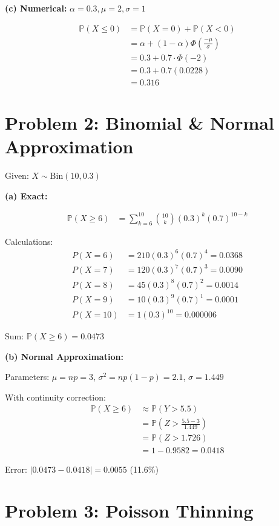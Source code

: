 \documentclass[10pt,twocolumn]{article}
\begin{document}
\textbf{(c) Numerical:} \(\alpha=0.3, \mu=2, \sigma=1\)

\begin{align*}
\mathbb{P}(X \leq 0) &= \mathbb{P}(X = 0) + \mathbb{P}(X < 0) \\
&= \alpha + (1-\alpha)\Phi\left(\frac{-\mu}{\sigma}\right) \\
&= 0.3 + 0.7 \cdot \Phi(-2) \\
&= 0.3 + 0.7(0.0228) \\
&= \boxed{0.316}
\end{align*}

\section*{Problem 2: Binomial \& Normal Approximation}

Given: \(X \sim \text{Bin}(10, 0.3)\)

\textbf{(a) Exact:}

\begin{align*}
\mathbb{P}(X \geq 6) &= \sum_{k=6}^{10} \binom{10}{k}(0.3)^k(0.7)^{10-k}
\end{align*}

Calculations:
\begin{align*}
P(X=6) &= 210(0.3)^6(0.7)^4 = 0.0368 \\
P(X=7) &= 120(0.3)^7(0.7)^3 = 0.0090 \\
P(X=8) &= 45(0.3)^8(0.7)^2 = 0.0014 \\
P(X=9) &= 10(0.3)^9(0.7)^1 = 0.0001 \\
P(X=10) &= 1(0.3)^{10} = 0.000006
\end{align*}

Sum: \(\boxed{\mathbb{P}(X \geq 6) = 0.0473}\)

\textbf{(b) Normal Approximation:}

Parameters: \(\mu = np = 3\), \(\sigma^2 = np(1-p) = 2.1\), \(\sigma = 1.449\)

With continuity correction:
\begin{align*}
\mathbb{P}(X \geq 6) &\approx \mathbb{P}(Y > 5.5) \\
&= \mathbb{P}\left(Z > \frac{5.5-3}{1.449}\right) \\
&= \mathbb{P}(Z > 1.726) \\
&= 1 - 0.9582 = \boxed{0.0418}
\end{align*}

Error: \(|0.0473 - 0.0418| = 0.0055\) (11.6\%)

\section*{Problem 3: Poisson Thinning}
\end{document}
